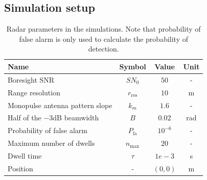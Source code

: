 \documentclass[english, 12pt, a4paper, elec, utf8, a-1b, online]{aaltothesis}
\begin{document}
\subsection{Simulation setup}\label{sec:ri_setup}

\newcommand{\sno}{SN_0}



\bgroup
\def \arraystretch{1.25}
\begin{table}[tb]
    \centering
    \begin{tabular}{|l|c|c|c|}
    \hline
    \textbf{Name}              & \textbf{Symbol} & \textbf{Value}  & \textbf{Unit}\\ \hline
    Boresight SNR              & $SN_0$          & $50$ & -          \\ \hline
    Range resolution            & $r_\text{res}$  & $10$ & m  \\ \hline
    Monopulse antenna pattern slope  & $k_m$      & $1.6$ & -  \\ \hline
    Half of the $-3$dB beamwidth & $B$             & $0.02$ & rad         \\ \hline
    Probability of false alarm & $P_\text{fa}$   & $10^{-6}$ & -      \\ \hline
    Maximum number of dwells   & $n_\text{max}$  & $20$ & -  \\ \hline
    Dwell time                 & $\tau$          & $1e-3$ & s   \\ \hline
    Position                   & -               & $(0, 0)$ & m \\ \hline
    \end{tabular}
    \caption{Radar parameters in the simulations. Note that probability of false alarm is only used to calculate the probability of detection.}
    \label{tab:radar_parameters}
\end{table}
\egroup
\end{document}
